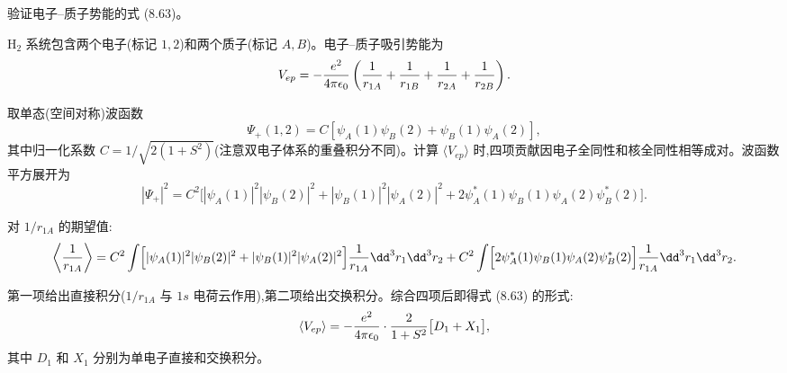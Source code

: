 \begin{question}
验证电子--质子势能的式 (8.63)。

\par\smallskip
{}

\end{question}
\begin{solution}
$\mathrm H_2$ 系统包含两个电子(标记 $1,2$)和两个质子(标记 $A,B$)。电子--质子吸引势能为
\[
V_{ep}=-{e^2\over4\pi\epsilon_0}\left({1\over r_{1A}}+{1\over r_{1B}}+{1\over r_{2A}}+{1\over r_{2B}}\right).
\]

取单态(空间对称)波函数
\[
\Psi_+(1,2)=C[\psi_A(1)\psi_B(2)+\psi_B(1)\psi_A(2)],
\]
其中归一化系数 $C=1/\sqrt{2(1+S^2)}$(注意双电子体系的重叠积分不同)。计算 $\langle V_{ep}\rangle$ 时,四项贡献因电子全同性和核全同性相等成对。波函数平方展开为
\[
|\Psi_+|^2=C^2\bigl[|\psi_A(1)|^2|\psi_B(2)|^2+|\psi_B(1)|^2|\psi_A(2)|^2
+2\psi_A^*(1)\psi_B(1)\psi_A(2)\psi_B^*(2)\bigr].
\]

对 $1/r_{1A}$ 的期望值:
\[
\left\langle{1\over r_{1A}}\right\rangle=
C^2\int\Bigl[|\psi_A(1)|^2|\psi_B(2)|^2
+|\psi_B(1)|^2|\psi_A(2)|^2\Bigr]{1\over r_{1A}}\dd^3r_1\dd^3r_2
+C^2\int\Bigl[2\psi_A^*(1)\psi_B(1)\psi_A(2)\psi_B^*(2)\Bigr]{1\over r_{1A}}\dd^3r_1\dd^3r_2.
\]

第一项给出直接积分($1/r_{1A}$ 与 $1s$ 电荷云作用),第二项给出交换积分。综合四项后即得式 (8.63) 的形式:
\[
\langle V_{ep}\rangle=-{e^2\over4\pi\epsilon_0}\cdot{2\over1+S^2}
\bigl[D_1+X_1\bigr],
\]
其中 $D_1$ 和 $X_1$ 分别为单电子直接和交换积分。
\end{solution}

